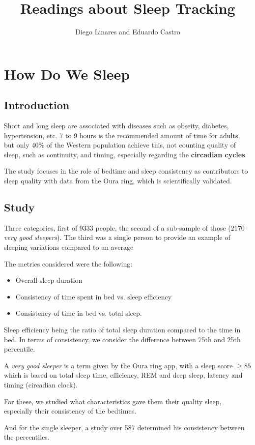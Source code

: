 \documentclass{IEEEtran}
\title{Readings about Sleep Tracking}
\author{Diego Linares and Eduardo Castro}
\begin{document}
  \maketitle
  \section{How Do We Sleep}
    \subsection{Introduction}
      Short and long sleep are associated with diseases such as obseity, diabetes, hypertension, etc. 7 to 9 hours is the recommended amount of time for adults, but only 40\% of the Western population achieve this, not counting quality of sleep, such as continuity, and timing, especially regarding the \textbf{circadian cycles}. \par
      The study focuses in the role of bedtime and sleep consistency as contributors to sleep quality with data from the Oura ring, which is scientifically validated.
    \subsection{Study}
      Three categories, first of 9333 people, the second of a sub-sample of those (2170 \textit{very good sleepers}). The third was a single person to provide an example of sleeping variations compared to an average \par
      The metrics considered were the following:
      \begin{itemize}
        \item Overall sleep duration
        \item Consistency of time spent in bed vs. sleep efficiency
        \item Consistency of time in bed vs. total sleep.
      \end{itemize}
      \par Sleep efficiency being the ratio of total sleep duration compared to the time in bed. In terms of consistency, we consider the difference between 75th and 25th percentile. \par 
      A \textit{very good sleeper} is a term given by the Oura ring app, with a sleep score $\geq 85$ which is based on total sleep time, efficiency, REM and deep sleep, latency and timing (circadian clock). \par 
      For these, we studied what characteristics gave them their quality sleep, especially their consistency of the bedtimes. \par 
      And for the single sleeper, a study over 587 determined his consistency between the percentiles.
\end{document}
